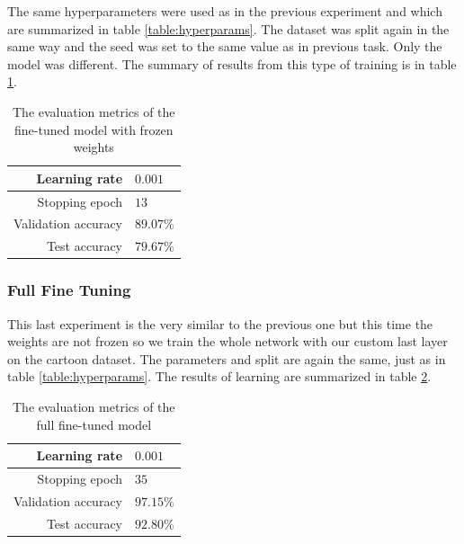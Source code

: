 \documentclass[a4paper,11pt]{article}
\begin{document}
The same hyperparameters were used as in the previous experiment and which are summarized in table \ref{table:hyperparams}.
The dataset was split again in the same way and the seed was set to the same value as in previous task.
Only the model was different.
The summary of results from this type of training is in table \ref{table:fine_tuning_acc}.

\begin{table}[ht]
    \centering
    \begin{tabular}{ | r | l | }
        \hline
        Learning rate       & $0.001$   \\
        \hline
        Stopping epoch      & $13$      \\
        \hline
        Validation accuracy & $89.07\%$ \\
        \hline
        Test accuracy       & $79.67\%$ \\
        \hline
    \end{tabular}
    \caption{The evaluation metrics of the fine-tuned model with frozen weights}
    \label{table:fine_tuning_acc}
\end{table}

\subsubsection{Full Fine Tuning}
This last experiment is the very similar to the previous one but this time the weights are not frozen so we train the whole network with our custom last layer on the cartoon dataset.
The parameters and split are again the same, just as in table \ref{table:hyperparams}.
The results of learning are summarized in table \ref{table:full_fine_tuning_acc}.

\begin{table}[ht]
    \centering
    \begin{tabular}{ | r | l | }
        \hline
        Learning rate       & $0.001$   \\
        \hline
        Stopping epoch      & $35$      \\
        \hline
        Validation accuracy & $97.15\%$ \\
        \hline
        Test accuracy       & $92.80\%$ \\
        \hline
    \end{tabular}
    \caption{The evaluation metrics of the full fine-tuned model}
    \label{table:full_fine_tuning_acc}
\end{table}
\end{document}
